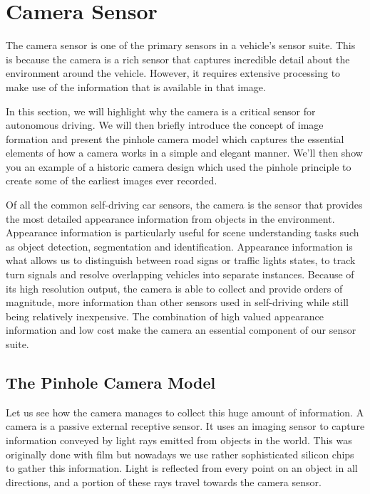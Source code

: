\section{Camera Sensor}
\label{camera_sensor}

The camera sensor is one of the primary sensors in a vehicle's sensor suite.
This is because the camera is a rich sensor that captures incredible detail
about the environment around the vehicle. However, it requires
extensive processing to make use of the information that is
available in that image. 

In this section, we will highlight why the camera is a critical sensor
for autonomous driving. We will then briefly introduce the concept of
image formation and present the pinhole camera model
which captures the essential elements of how a camera works in a simple
and elegant manner. We'll then show you an example of
a historic camera design which used the pinhole
principle to create some of the earliest
images ever recorded. 



Of all the common self-driving car sensors, the camera is the sensor
that provides the most detailed appearance information from objects in the environment. Appearance information
is particularly useful for scene understanding tasks such as object detection, segmentation and identification. 
Appearance information is what allows us to distinguish between road signs or
traffic lights states, to track turn signals and resolve overlapping vehicles
into separate instances. Because of its high
resolution output, the camera is able to collect and provide orders of magnitude, more information than
other sensors used in self-driving while still
being relatively inexpensive. The combination of high valued
appearance information and low cost make
the camera an essential component of our sensor suite. 


\subsection{The Pinhole Camera Model}
\label{pinhole_model}

Let us see how the camera manages to collect this huge amount
of information. A camera is a passive
external receptive sensor. It uses an imaging sensor
to capture information conveyed by light rays emitted
from objects in the world. This was originally done with
film but nowadays we use rather sophisticated
silicon chips to gather this information. Light is reflected
from every point on an object in all directions, and a portion of these rays travel towards the camera sensor. 

